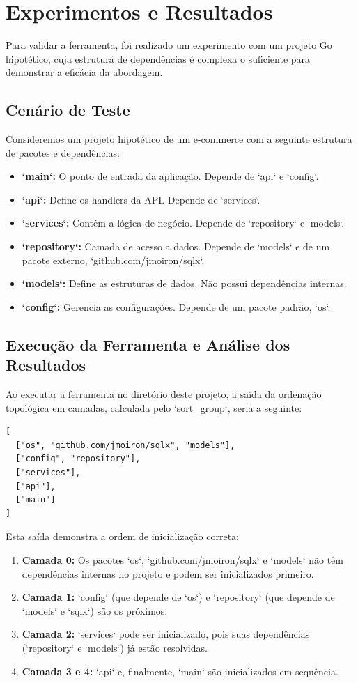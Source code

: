 \documentclass[12pt]{article}
\begin{document}
\section{Experimentos e Resultados}
Para validar a ferramenta, foi realizado um experimento com um projeto Go hipotético, cuja estrutura de dependências é complexa o suficiente para demonstrar a eficácia da abordagem.

\subsection{Cenário de Teste}
Consideremos um projeto hipotético de um e-commerce com a seguinte estrutura de pacotes e dependências:

\begin{itemize}
    \item \textbf{`main`:} O ponto de entrada da aplicação. Depende de `api` e `config`.
    \item \textbf{`api`:} Define os handlers da API. Depende de `services`.
    \item \textbf{`services`:} Contém a lógica de negócio. Depende de `repository` e `models`.
    \item \textbf{`repository`:} Camada de acesso a dados. Depende de `models` e de um pacote externo, `github.com/jmoiron/sqlx`.
    \item \textbf{`models`:} Define as estruturas de dados. Não possui dependências internas.
    \item \textbf{`config`:} Gerencia as configurações. Depende de um pacote padrão, `os`.
\end{itemize}

\subsection{Execução da Ferramenta e Análise dos Resultados}
Ao executar a ferramenta no diretório deste projeto, a saída da ordenação topológica em camadas, calculada pelo `sort\_group`, seria a seguinte:

\begin{verbatim}
[
  ["os", "github.com/jmoiron/sqlx", "models"],
  ["config", "repository"],
  ["services"],
  ["api"],
  ["main"]
]
\end{verbatim}

Esta saída demonstra a ordem de inicialização correta:
\begin{enumerate}
    \item \textbf{Camada 0:} Os pacotes `os`, `github.com/jmoiron/sqlx` e `models` não têm dependências internas no projeto e podem ser inicializados primeiro.
    \item \textbf{Camada 1:} `config` (que depende de `os`) e `repository` (que depende de `models` e `sqlx`) são os próximos.
    \item \textbf{Camada 2:} `services` pode ser inicializado, pois suas dependências (`repository` e `models`) já estão resolvidas.
    \item \textbf{Camada 3 e 4:} `api` e, finalmente, `main` são inicializados em sequência.
\end{enumerate}
\end{document}
